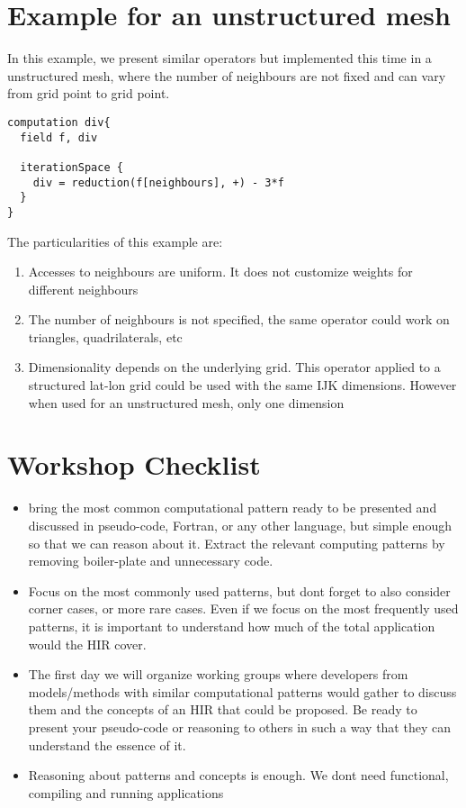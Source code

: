 \documentclass[a4paper,10pt]{scrartcl}
\begin{document}
\section{Example for an unstructured mesh}
In this example, we present similar operators but implemented this time in a unstructured mesh, where the number of neighbours are not fixed and can vary from grid point to grid point.

\begin{lstlisting}
computation div{
  field f, div
  
  iterationSpace {
    div = reduction(f[neighbours], +) - 3*f
  }
}
\end{lstlisting}

The particularities of this example are:
\begin{enumerate}
	\item Accesses to neighbours are uniform. It does not customize weights for different neighbours
	\item The number of neighbours is not specified, the same operator could work on triangles, quadrilaterals, etc
	\item Dimensionality depends on the underlying grid. This operator applied to a structured lat-lon grid could be used with the same IJK dimensions. However when used for an unstructured mesh, only one dimension
\end{enumerate}

\section{Workshop Checklist}

\begin{itemize}
	\item bring the most common computational pattern ready to be presented and discussed in pseudo-code, Fortran, or any other language, but simple enough so that we can reason about it. Extract the relevant computing patterns by removing boiler-plate and unnecessary code.
	\item Focus on the most commonly used patterns, but dont forget to also consider corner cases, or more rare cases. Even if we focus on the most frequently used patterns, it is important to understand how much of the total application would the HIR cover.
	\item The first day we will organize working groups where developers from models/methods with similar computational patterns would gather to discuss them and the concepts of an HIR that could be proposed. Be ready to present your pseudo-code or reasoning to others in such a way that they can understand the essence of it.
	\item Reasoning about patterns and concepts is enough. We dont need functional, compiling and running applications
\end{itemize}
\end{document}
